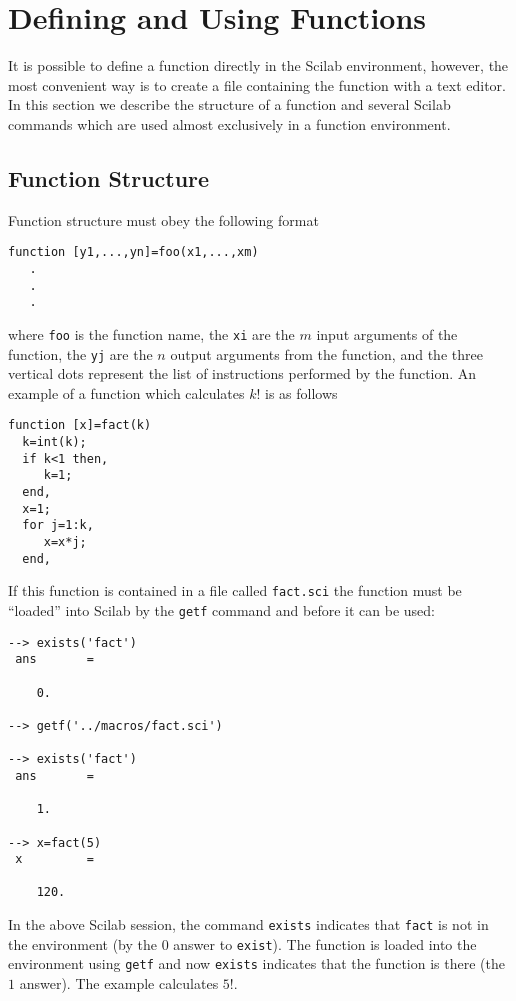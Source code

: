 \section{Defining and Using Functions}
\label{s4.2}

	It is possible to define a function directly in
the Scilab environment, however, the most convenient way
is to create a file containing the function
with a text editor.  In this section we describe the
structure of a function and several Scilab commands which are
used almost exclusively in a function environment.

\subsection{Function Structure}
Function structure must obey the following format
\begin{verbatim}
function [y1,...,yn]=foo(x1,...,xm)
   .
   .
   .
\end{verbatim}
where {\tt foo} is the function name, the {\tt xi} are the $m$ input arguments
of the function,  the {\tt yj} are the $n$ output arguments from the function, and
the three vertical dots represent the list of instructions performed by
the function.  An example of a function
which calculates $k!$ is as follows
\begin{verbatim}
function [x]=fact(k)
  k=int(k);
  if k<1 then, 
     k=1; 
  end,
  x=1;
  for j=1:k,
     x=x*j;
  end,
\end{verbatim}
If this function is contained in a file called {\tt fact.sci} the function
must be ``loaded'' into  Scilab by the {\tt getf} command and before
it can be used:
\begin{verbatim}
--> exists('fact')
 ans       =
 
    0.  
 
--> getf('../macros/fact.sci')
 
--> exists('fact')
 ans       =
 
    1.  
 
--> x=fact(5)
 x         =
 
    120.  
\end{verbatim}
In the above Scilab session, the command 
{\tt exists} 
indicates that
{\tt fact} is not in the environment (by the $0$ answer to {\tt exist}).  The
function is loaded into the environment using {\tt getf} and now {\tt exists}
indicates that the function is there (the $1$ answer).  The example 
calculates $5!$. 

